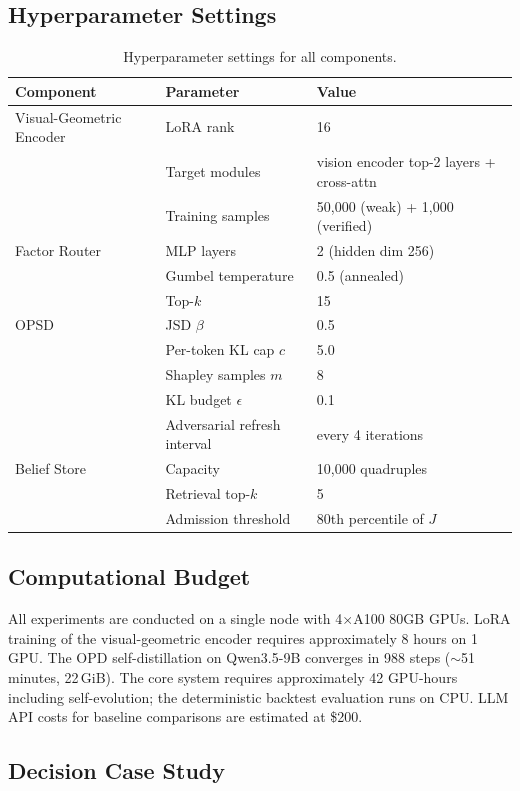 \subsection{Hyperparameter Settings}

\begin{table}[h]
\centering
\small
\begin{tabular}{lll}
\toprule
Component & Parameter & Value \\
\midrule
Visual-Geometric Encoder & LoRA rank & 16 \\
 & Target modules & vision encoder top-2 layers + cross-attn \\
 & Training samples & 50,000 (weak) + 1,000 (verified) \\
Factor Router & MLP layers & 2 (hidden dim 256) \\
 & Gumbel temperature & 0.5 (annealed) \\
 & Top-$k$ & 15 \\
OPSD & JSD $\beta$ & 0.5 \\
 & Per-token KL cap $c$ & 5.0 \\
 & Shapley samples $m$ & 8 \\
 & KL budget $\epsilon$ & 0.1 \\
 & Adversarial refresh interval & every 4 iterations \\
Belief Store & Capacity & 10,000 quadruples \\
 & Retrieval top-$k$ & 5 \\
 & Admission threshold & 80th percentile of $J$ \\
\bottomrule
\end{tabular}
\caption{Hyperparameter settings for all components.}
\label{tab:hyperparams}
\end{table}

\subsection{Computational Budget}

All experiments are conducted on a single node with 4$\times$A100 80GB GPUs. LoRA training of the visual-geometric encoder requires approximately 8 hours on 1 GPU. The OPD self-distillation on Qwen3.5-9B converges in 988 steps ($\sim$51 minutes, 22\,GiB). The core system requires approximately 42 GPU-hours including self-evolution; the deterministic backtest evaluation runs on CPU. LLM API costs for baseline comparisons are estimated at \$200.

\subsection{Decision Case Study}
\label{sec:case_study}

